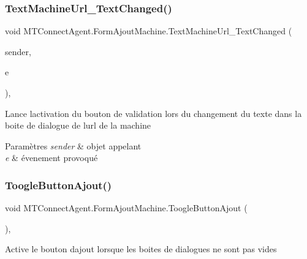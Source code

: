 \subsubsection{\texorpdfstring{Text\+Machine\+Url\+\_\+\+Text\+Changed()}{TextMachineUrl\_TextChanged()}}
{\footnotesize\ttfamily void M\+T\+Connect\+Agent.\+Form\+Ajout\+Machine.\+Text\+Machine\+Url\+\_\+\+Text\+Changed (\begin{DoxyParamCaption}\item[{object}]{sender,  }\item[{Event\+Args}]{e }\end{DoxyParamCaption})\hspace{0.3cm}{\ttfamily [inline]}, {\ttfamily [private]}}



Lance l\textquotesingle{}activation du bouton de validation lors du changement du texte dans la boite de dialogue de l\textquotesingle{}url de la machine 


\begin{DoxyParams}{Paramètres}
{\em sender} & objet appelant\\
\hline
{\em e} & évenement provoqué\\
\hline
\end{DoxyParams}
\mbox{\label{class_m_t_connect_agent_1_1_form_ajout_machine_a36df449c486dc97b83b4d4463ef98e15}} 
\subsubsection{\texorpdfstring{Toogle\+Button\+Ajout()}{ToogleButtonAjout()}}
{\footnotesize\ttfamily void M\+T\+Connect\+Agent.\+Form\+Ajout\+Machine.\+Toogle\+Button\+Ajout (\begin{DoxyParamCaption}{ }\end{DoxyParamCaption})\hspace{0.3cm}{\ttfamily [inline]}, {\ttfamily [private]}}



Active le bouton d\textquotesingle{}ajout lorsque les boites de dialogues ne sont pas vides 



